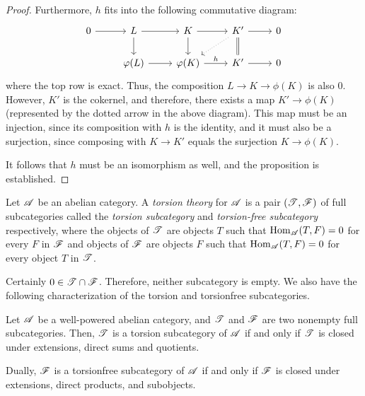 \begin{proof}
Furthermore, $h$ fits into the following commutative diagram:
\[
\begin{tikzcd}
0 \arrow{r} &
L \arrow{r} \arrow{d} &
K \arrow{r} \arrow{d} &
K' \arrow{r} \arrow[equals]{d} \arrow[dotted]{ld} &
0 \\
& \phi(L) \arrow{r} &
\phi(K) \arrow{r}{h} &
K' \arrow{r} &
0
\end{tikzcd}
\]
where the top row is exact. Thus, the composition $L \to K \to 
\phi(K)$ is also $0$. However, $K'$ is the cokernel, and 
therefore, there exists a map $K' \to \phi(K)$ (represented by the 
dotted arrow in the above diagram). This map must be an injection, 
since its composition with $h$ is the identity, and it must also 
be a surjection, since composing with $K \to K'$ equals the 
surjection $K \to \phi(K)$.

It follows that $h$ must be an isomorphism as well, and the 
proposition is established.
\end{proof}

\begin{defn}
Let $\mathscr{A}$ be an abelian category. A \emph{torsion theory} for
$\mathscr{A}$ is a pair $(\mathscr{T}, \mathscr{F})$ of full subcategories 
called the \emph{torsion subcategory} and \emph{torsion-free 
subcategory} respectively, where the objects of $\mathscr{T}$ are
objects $T$ such that $\mathrm{Hom}_{\mathscr{A}}(T, F) = 0$ for every $F$
in $\mathscr{F}$ and objects of $\mathscr{F}$ are objects $F$ such that
$\mathrm{Hom}_{\mathscr{A}}(T, F) = 0$ for every object $T$ in $\mathscr{T}$.
\end{defn}

Certainly $0 \in \mathscr{T} \cap \mathscr{F}$. Therefore, neither 
subcategory is empty. We also have the following characterization
of the torsion and torsionfree subcategories.

\begin{prop}\label{prop_tt_properties}
Let $\mathscr{A}$ be a well-powered abelian category, and $\mathscr{T}$ 
and $\mathscr{F}$ are two nonempty full subcategories. Then, $\mathscr{T}$ 
is a torsion subcategory of $\mathscr{A}$ if and only if $\mathscr{T}$ is 
closed under extensions, direct sums and quotients. 

Dually, $\mathscr{F}$ is a torsionfree subcategory of $\mathscr{A}$ if and 
only if $\mathscr{F}$ is closed under extensions, direct products, and 
subobjects.
\end{prop}


